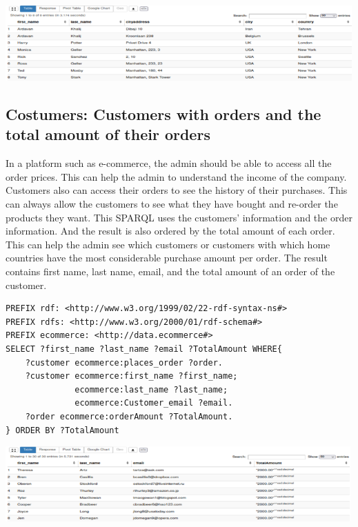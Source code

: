 \documentclass{article}
\begin{document}
\begin{center}
   \includegraphics[scale=0.6]{OISreport-costumer-query.png}
\end{center}

\newpage

\subsection{Costumers: Customers with orders and the total amount of their orders}
In a platform such as e-commerce, the admin should be able to access all the order prices. This can help the admin to understand the income of the company. Customers also can access their orders to see the history of their purchases. This can always allow the customers to see what they have bought and re-order the products they want. This SPARQL uses the customers' information and the order information. And the result is also ordered by the total amount of each order. This can help the admin see which customers or customers with which home countries have the most considerable purchase amount per order. The result contains first name, last name, email, and the total amount of an order of the customer.

\begin{lstlisting}[breaklines, frame=single]
PREFIX rdf: <http://www.w3.org/1999/02/22-rdf-syntax-ns#>
PREFIX rdfs: <http://www.w3.org/2000/01/rdf-schema#>
PREFIX ecommerce: <http://data.ecommerce#>
SELECT ?first_name ?last_name ?email ?TotalAmount WHERE{
	?customer ecommerce:places_order ?order.
	?customer ecommerce:first_name ?first_name;
			  ecommerce:last_name ?last_name;
			  ecommerce:Customer_email ?email.
	?order ecommerce:orderAmount ?TotalAmount.
} ORDER BY ?TotalAmount
\end{lstlisting}

\begin{center}
   \includegraphics[scale=0.6]{OISreport-costumer-query2.png}
\end{center}
\end{document}
